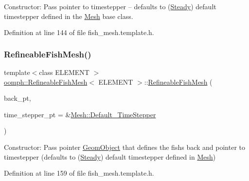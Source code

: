 Constructor\+: Pass pointer to timestepper -- defaults to (\hyperlink{classoomph_1_1Steady}{Steady}) default timestepper defined in the \hyperlink{classoomph_1_1Mesh}{Mesh} base class. 



Definition at line 144 of file fish\+\_\+mesh.\+template.\+h.

\mbox{\label{classoomph_1_1RefineableFishMesh_a82bc04aea6deaf2faa7306aa047e12ef}} 
\subsubsection{\texorpdfstring{Refineable\+Fish\+Mesh()}{RefineableFishMesh()}\hspace{0.1cm}{\footnotesize\ttfamily [2/2]}}
{\footnotesize\ttfamily template$<$class E\+L\+E\+M\+E\+NT $>$ \\
\hyperlink{classoomph_1_1RefineableFishMesh}{oomph\+::\+Refineable\+Fish\+Mesh}$<$ E\+L\+E\+M\+E\+NT $>$\+::\hyperlink{classoomph_1_1RefineableFishMesh}{Refineable\+Fish\+Mesh} (\begin{DoxyParamCaption}\item[{\hyperlink{classoomph_1_1GeomObject}{Geom\+Object} $\ast$}]{back\+\_\+pt,  }\item[{\hyperlink{classoomph_1_1TimeStepper}{Time\+Stepper} $\ast$}]{time\+\_\+stepper\+\_\+pt = {\ttfamily \&\hyperlink{classoomph_1_1Mesh_a12243d0fee2b1fcee729ee5a4777ea10}{Mesh\+::\+Default\+\_\+\+Time\+Stepper}} }\end{DoxyParamCaption})\hspace{0.3cm}{\ttfamily [inline]}}



Constructor\+: Pass pointer \hyperlink{classoomph_1_1GeomObject}{Geom\+Object} that defines the fish\textquotesingle{}s back and pointer to timestepper (defaults to (\hyperlink{classoomph_1_1Steady}{Steady}) default timestepper defined in \hyperlink{classoomph_1_1Mesh}{Mesh}) 



Definition at line 159 of file fish\+\_\+mesh.\+template.\+h.

\mbox{\label{classoomph_1_1RefineableFishMesh_a8304d093e015001a6d56faebdd2d4636}} 
